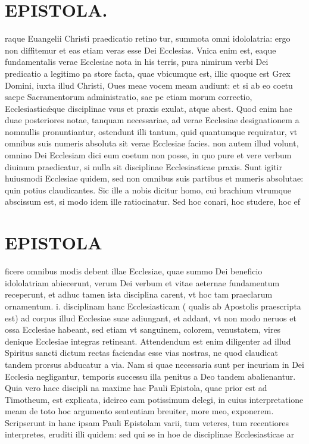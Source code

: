 \documentclass{article}
\begin{document}
\begin{pages}
\section*{EPISTOLA. }\pstart raque Euangelii Christi praedicatio retino tur, summota omni idololatria: ergo non diffitemur et eas etiam veras esse Dei Ecclesias. Vnica enim est, eaque fundamentalis verae Ecclesiae nota in his terris, pura nimirum verbi Dei predicatio a legitimo pa store facta, quae vbicumque est, illic quoque est Grex Domini, iuxta illud Christi, Oues meae vocem meam audiunt: et si ab eo coetu saepe Sacramentorum administratio, sae pe etiam morum correctio, Ecclesiasticǽque disciplinae vsus et praxis exulat, atque abest. Quod enim hae duae posteriores notae, tanquam necessariae, ad verae Ecclesiae designationem a nomnullis pronuntiantur, ostendunt illi tantum, quid quantumque requiratur, vt omnibus suis numeris absoluta sit verae Ecclesiae facies. non autem illud volunt, omnino Dei Ecclesiam dici eum coetum non posse, in quo pure et vere verbum diuinum praedicatur, si nulla sit disciplinae Ecclesiasticae praxis. Sunt igitir huiusmodi Ecclesiae quidem, sed non omnibus suis partibus et numeris absolutae: quin potius claudicantes. Sic ille a nobis dicitur homo, cui brachium vtrumque abscissum est, si modo idem ille ratiocinatur. Sed hoc conari, hoc studere, hoc ef\pend
\section*{EPISTOLA }\pstart ficere omnibus modis debent illae Ecclesiae, quae summo Dei beneficio idololatriam abiecerunt, verum Dei verbum et vitae aeternae fundamentum receperunt, et adhuc tamen ista disciplina carent, vt hoc tam praeclarum ornamentum. i. disciplinam hanc Ecclesiasticam ( qualis ab Apostolis praescripta est) ad corpus illud Ecclesiae suae adiungant, et addant, vt non modo neruos et ossa Ecclesiae habeant, sed etiam vt sanguinem, colorem, venustatem, vires denique Ecclesiae integras retineant. Attendendum est enim diligenter ad illud Spiritus sancti dictum rectas faciendas esse vias nostras, ne quod claudicat tandem prorsus abducatur a via. Nam si quae necessaria sunt per incuriam in Dei Ecclesia negligantur, temporis successu illa penitus a Deo tandem abalienantur. Quia vero haec discipli na maxime hac Pauli Epistola, quae prior est ad Timotheum, est explicata, idcirco eam potissimum delegi, in cuius interpretatione meam de toto hoc argumento sententiam breuiter, more meo, exponerem. Scripserunt in hanc ipsam Pauli Epistolam varii, tum veteres, tum recentiores interpretes, eruditi illi quidem: sed qui se in hoe de disciplinae Ecclesiasticae ar\pend

\end{pages}
\end{document}
